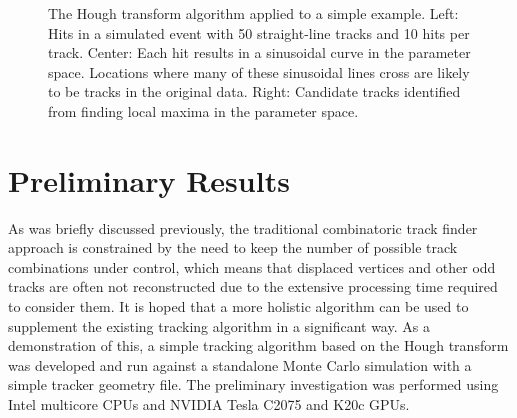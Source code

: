 \documentclass{JINST}
\begin{document}
\begin{figure}[!Hhtb]
\begin{center}
  \caption{The Hough transform algorithm applied to a simple example. Left: Hits in a simulated event with 50
    straight-line tracks and 10 hits per track. Center: Each hit results in a sinusoidal curve in the parameter
    space. Locations where many of these sinusoidal lines cross are likely to be tracks in the original data. Right:
    Candidate tracks identified from finding local maxima in the parameter space.\label{fig:hough}}
\end{center}
\end{figure}

\section{Preliminary Results}

As was briefly discussed previously, the traditional combinatoric track finder approach is constrained by the need to
keep the number of possible track combinations under control, which means that displaced vertices and other odd tracks
are often not reconstructed due to the extensive processing time required to consider them.
It is hoped that a more holistic algorithm can be used to supplement the existing
tracking algorithm in a significant way.  As a demonstration of this, a simple tracking algorithm based on
the Hough transform was developed and run against a standalone Monte Carlo simulation with a simple
tracker geometry file.  The preliminary investigation was performed using Intel multicore CPUs and NVIDIA
Tesla C2075 and K20c GPUs.
\end{document}
